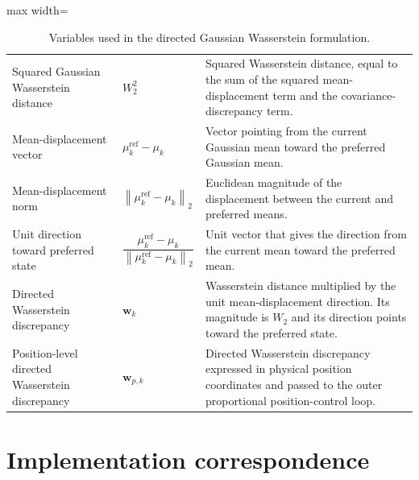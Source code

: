 \documentclass[a4paper]{article}
\begin{document}
\begin{table}[H]
\begin{adjustbox}{max width=\textwidth}
\begin{tabular}{p{} p{} p{}}
         Squared Gaussian Wasserstein distance
         & $W_2^2$
         & Squared Wasserstein distance, equal to the sum of the squared mean-displacement term and the covariance-discrepancy term. \\

         Mean-displacement vector
         & $\mu_k^{\mathrm{ref}}-\mu_k$
         & Vector pointing from the current Gaussian mean toward the preferred Gaussian mean. \\

         Mean-displacement norm
         & $\left\|\mu_k^{\mathrm{ref}}-\mu_k\right\|_2$
         & Euclidean magnitude of the displacement between the current and preferred means. \\

         Unit direction toward preferred state
         & $\dfrac{\mu_k^{\mathrm{ref}}-\mu_k}{\left\|\mu_k^{\mathrm{ref}}-\mu_k\right\|_2}$
         & Unit vector that gives the direction from the current mean toward the preferred mean. \\

         Directed Wasserstein discrepancy
         & $\mathbf{w}_k$
         & Wasserstein distance multiplied by the unit mean-displacement direction. Its magnitude is $W_2$ and its direction points toward the preferred state. \\

         Position-level directed Wasserstein discrepancy
         & $\mathbf{w}_{p,k}$
         & Directed Wasserstein discrepancy expressed in physical position coordinates and passed to the outer proportional position-control loop. \\

         \hline
      \end{tabular}
      \end{adjustbox}

      \caption{Variables used in the directed Gaussian Wasserstein formulation.}
      \label{tab:directed-gaussian-wasserstein-variables}
   \end{table}

   \section{Implementation correspondence}
\end{document}
